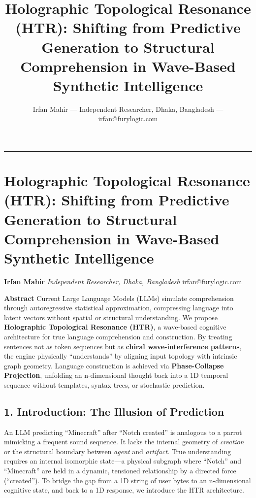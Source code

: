 \documentclass[
  11pt,
  a4paper,
]{article}
\title{Holographic Topological Resonance (HTR): Shifting from Predictive
Generation to Structural Comprehension in Wave-Based Synthetic
Intelligence}
\author{Irfan Mahir --- Independent Researcher, Dhaka, Bangladesh ---
irfan@furylogic.com}
\date{}
\begin{document}
\maketitle

{
\hypersetup{linkcolor=}
\setcounter{tocdepth}{3}
\tableofcontents
}
\begin{center}\rule{0.5\linewidth}{0.5pt}\end{center}

\section{Holographic Topological Resonance (HTR): Shifting from
Predictive Generation to Structural Comprehension in Wave-Based
Synthetic
Intelligence}\label{holographic-topological-resonance-htr-shifting-from-predictive-generation-to-structural-comprehension-in-wave-based-synthetic-intelligence}

\textbf{Irfan Mahir} \emph{Independent Researcher, Dhaka, Bangladesh}
irfan@furylogic.com

\textbf{Abstract} Current Large Language Models (LLMs) simulate
comprehension through autoregressive statistical approximation,
compressing language into latent vectors without spatial or structural
understanding. We propose \textbf{Holographic Topological Resonance
(HTR)}, a wave-based cognitive architecture for true language
comprehension and construction. By treating sentences not as token
sequences but as \textbf{chiral wave-interference patterns}, the engine
physically ``understands'' by aligning input topology with intrinsic
graph geometry. Language construction is achieved via
\textbf{Phase-Collapse Projection}, unfolding an n-dimensional thought
back into a 1D temporal sequence without templates, syntax trees, or
stochastic prediction.

\subsection{1. Introduction: The Illusion of
Prediction}\label{introduction-the-illusion-of-prediction}

An LLM predicting ``Minecraft'' after ``Notch created'' is analogous to
a parrot mimicking a frequent sound sequence. It lacks the internal
geometry of \emph{creation} or the structural boundary between
\emph{agent} and \emph{artifact}. True understanding requires an
internal isomorphic state---a physical subgraph where ``Notch'' and
``Minecraft'' are held in a dynamic, tensioned relationship by a
directed force (``created''). To bridge the gap from a 1D string of user
bytes to an n-dimensional cognitive state, and back to a 1D response, we
introduce the HTR architecture.
\end{document}
